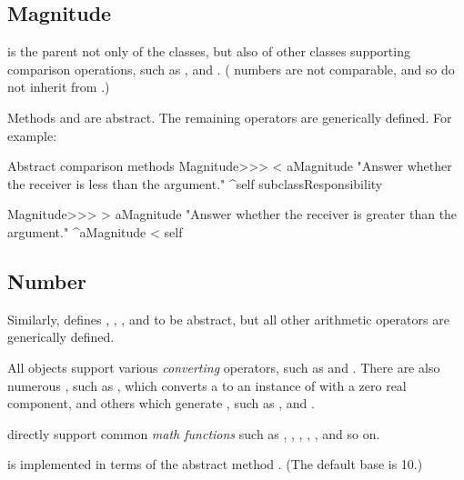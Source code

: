 \documentclass[a4paper,10pt,twoside]{book}
\begin{document}
\subsection{Magnitude}

 is the parent not only of the  classes, but also of other classes supporting comparison operations, such as ,  and .
( numbers are not comparable, and so do not inherit from .)

Methods  and  are abstract.
The remaining operators are generically defined.
For example:

\begin{method}{Abstract comparison methods}
Magnitude>>> < aMagnitude 
    "Answer whether the receiver is less than the argument."
    ^self subclassResponsibility

Magnitude>>> > aMagnitude 
    "Answer whether the receiver is greater than the argument."
    ^aMagnitude < self
\end{method}

\subsection{Number}

Similarly,  defines , , , and  to be abstract, but all other arithmetic operators are generically defined.

All  objects support various \emph{converting} operators, such as  and .
There are also numerous , such as , which converts a  to an instance of  with a zero real component, and others which generate , such as ,  and .

 directly support common \emph{math functions} such as , , , , , and so on.

 is implemented in terms of the abstract method .
(The default base is 10.)
\end{document}
